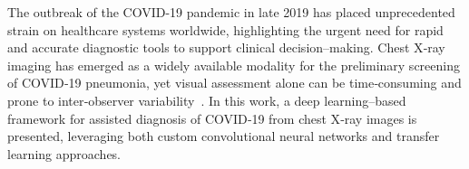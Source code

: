 \documentclass[conference]{IEEEtran}
\begin{document}

The outbreak of the COVID-19 pandemic in late 2019 has placed unprecedented strain on healthcare systems worldwide, highlighting the urgent need for rapid and accurate diagnostic tools to support clinical decision–making. Chest X‑ray imaging has emerged as a widely available modality for the preliminary screening of COVID‑19 pneumonia, yet visual assessment alone can be time‑consuming and prone to inter‑observer variability~\cite{b1,b2}. In this work, a deep learning–based framework for assisted diagnosis of COVID‑19 from chest X‑ray images is presented, leveraging both custom convolutional neural networks and transfer learning approaches.
\end{document}
